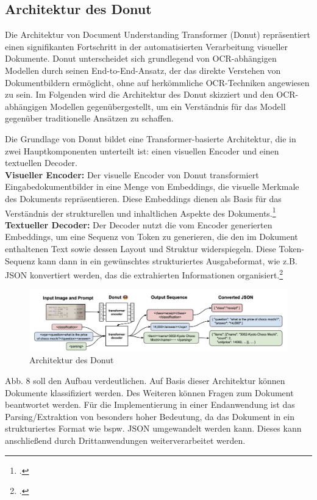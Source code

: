 \subsection{Architektur des Donut}
Die Architektur von Document Understanding Transformer (Donut) repräsentiert einen signifikanten Fortschritt in der automatisierten Verarbeitung visueller Dokumente. Donut unterscheidet sich grundlegend von OCR-abhängigen Modellen durch seinen End-to-End-Ansatz, der das direkte Verstehen von Dokumentbildern ermöglicht, ohne auf herkömmliche OCR-Techniken angewiesen zu sein. Im Folgenden wird die Architektur des Donut skizziert und den OCR-abhängigen Modellen gegenübergestellt, um ein Verständnis für das Modell gegenüber traditionelle Ansätzen zu schaffen.

Die Grundlage von Donut bildet eine Transformer-basierte Architektur, die in zwei Hauptkomponenten unterteilt ist: einen visuellen Encoder und einen textuellen Decoder.\\
\textbf{Visueller Encoder:} Der visuelle Encoder von Donut transformiert Eingabedokumentbilder in eine Menge von Embeddings, die visuelle Merkmale des Dokuments repräsentieren. Diese Embeddings dienen als Basis für das Verständnis der strukturellen und inhaltlichen Aspekte des Dokuments.\footcites[Vgl.][S. 4]{kim_ocr-free_2021}\\
\textbf{Textueller Decoder:} Der Decoder nutzt die vom Encoder generierten Embeddings, um eine Sequenz von Token zu generieren, die den im Dokument enthaltenen Text sowie dessen Layout und Struktur widerspiegeln. Diese Token-Sequenz kann dann in ein gewünschtes strukturiertes Ausgabeformat, wie z.B. \ac{JSON} konvertiert werden, das die extrahierten Informationen organisiert.\footcites[Vgl.][S. 5]{kim_ocr-free_2021}

\begin{figure}[]
    \centering
    \includegraphics[width=160mm]{graphics/donut-architecture.png}
    \caption[Architektur des Donut]{Architektur des Donut\footnotemark}
    \label{fig:donut-architecture}
\end{figure}
Abb. 8 soll den Aufbau verdeutlichen. Auf Basis dieser Architektur können Dokumente klassifiziert werden. Des Weiteren können Fragen zum Dokument beantwortet werden. Für die Implementierung in einer Endanwendung ist das Parsing/Extraktion von besonders hoher Bedeutung, da das Dokument in ein strukturiertes Format wie bspw. \ac{JSON} umgewandelt werden kann. Dieses kann anschließend durch Drittanwendungen weiterverarbeitet werden. 

